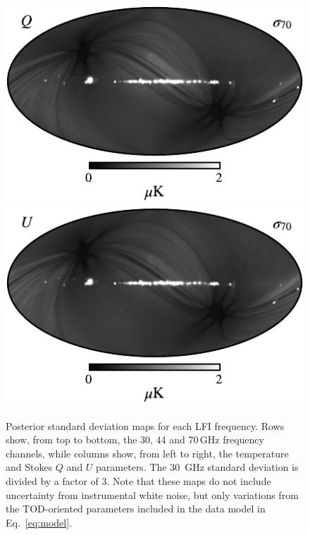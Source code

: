 \documentclass[twocolumn]{aa}
\begin{document}
\begin{figure}[p]
  \includegraphics[width=0.33\linewidth]{figs/BP_070_v2_Q_STDDEV_w8_n1024_cb_c-neutral.pdf}
  \includegraphics[width=0.33\linewidth]{figs/BP_070_v2_U_STDDEV_w8_n1024_cb_c-neutral.pdf}
  \caption{Posterior standard deviation maps for each LFI frequency. Rows show, from
    top to bottom, the 30, 44 and 70\,GHz frequency channels, while
    columns show, from left to right, the temperature and Stokes $Q$
    and $U$ parameters. The 30 \,GHz standard deviation is divided by a factor of 3. 
    Note that these maps do not include
    uncertainty from instrumental white noise, but only variations
    from the TOD-oriented parameters included in the data model in
    Eq.~\eqref{eq:model}. }
  \label{fig:freq_stddev}
  \vspace*{1cm}


\end{figure}
\end{document}
